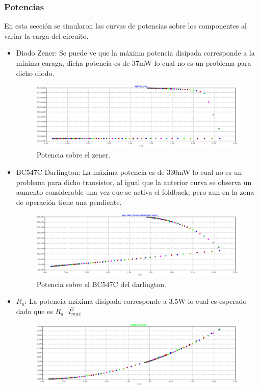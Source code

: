 \subsubsection{Potencias}
En esta sección se simularon las curvas de potencias sobre los componentes al variar la carga del circuito.\\
\begin{itemize}
\item Diodo Zener: 
Se puede ve que la máxima potencia disipada corresponde a la mínima caraga, dicha potencia es de 37mW lo cual no es un problema para dicho diodo.
\begin{figure}[H]
\centering
	\includegraphics[width=1\textwidth]{ImagenesEjercicio2/potzener.png}
	\caption{Potencia sobre el zener.}
	\label{fig:potzener}
\end{figure}
\item BC547C Darlington: La máxima potencia es de 330mW lo cual no es un problema para dicho transistor, al igual que la anterior curva se observa un aumento considerable una vez que se activa el foldback, pero aun en la zona de operación tiene una pendiente.
\begin{figure}[H]
\centering
	\includegraphics[width=1\textwidth]{ImagenesEjercicio2/potbc547.png}
	\caption{Potencia sobre el BC547C del darlington.}
	\label{fig:potbc547}
\end{figure}
\item $R_a$: La potencia máxima disipada corresponde a 3.5W lo cual es esperado dado que es $R_a\cdot I_{max}^2$ 
\begin{figure}[H]
\centering
	\includegraphics[width=1\textwidth]{ImagenesEjercicio2/potra.png}

\end{figure}
\end{itemize}
